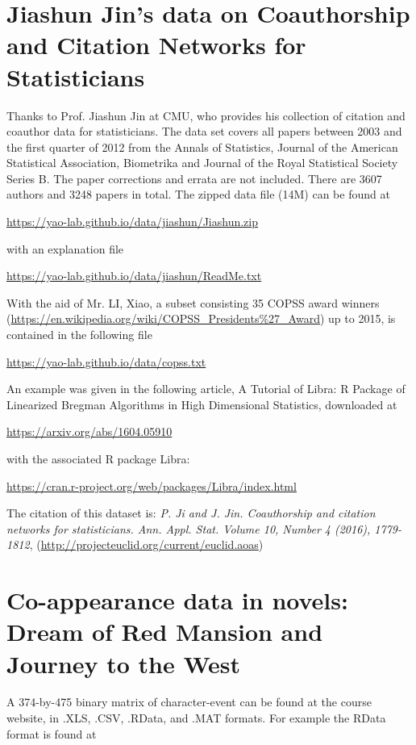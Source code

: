 \documentclass[11pt]{article}
\begin{document}
\section{Jiashun Jin's data on Coauthorship and Citation Networks for Statisticians}
Thanks to Prof. Jiashun Jin at CMU, who provides his collection of citation and coauthor data for statisticians. The data set covers all papers between 2003 and the first quarter of 2012 from the Annals of Statistics, Journal of the American Statistical Association, Biometrika and Journal of the Royal Statistical Society Series B. The paper corrections and errata are not included. There are 3607 authors and 3248 papers in total. The zipped data file (14M) can be found at 

\url{https://yao-lab.github.io/data/jiashun/Jiashun.zip}

\noindent with an explanation file

\url{https://yao-lab.github.io/data/jiashun/ReadMe.txt}

With the aid of Mr. LI, Xiao, a subset consisting 35 COPSS award winners (\url{https://en.wikipedia.org/wiki/COPSS_Presidents\%27_Award}) up to 2015, is contained in the following file

\url{https://yao-lab.github.io/data/copss.txt} 

\noindent An example was given in the following article, A Tutorial of Libra: R Package of Linearized Bregman Algorithms in High Dimensional Statistics, downloaded at

\url{https://arxiv.org/abs/1604.05910}

\noindent with the associated R package Libra:

\url{https://cran.r-project.org/web/packages/Libra/index.html}

The citation of this dataset is: \emph{P. Ji and J. Jin. Coauthorship and citation networks for statisticians. Ann. Appl. Stat. Volume 10, Number 4 (2016), 1779-1812}, (\url{http://projecteuclid.org/current/euclid.aoas})




\section{Co-appearance data in novels: Dream of Red Mansion and Journey to the West}

A 374-by-475 binary matrix of character-event can be found at the course website, in .XLS, .CSV, .RData, and .MAT formats. For example the RData format is found at
\end{document}

